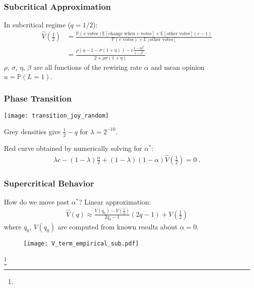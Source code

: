 \documentclass{beamer}
\newcommand\blfootnote[1]{%
  \begingroup
  \renewcommand\thefootnote{}\footnote{#1}%
  \addtocounter{footnote}{-1}%
  \endgroup
}
\newcommand\E[0]{\mathbb{E}}
\newcommand\prob[0]{\mathbb{P}}
\begin{document}
		\begin{frame}\frametitle{Subcritical Approximation}
			In subcritical regime ($q = 1/2$): 
			\begin{align*}
				\hat{V}\left(\frac{1}{2}\right) &=  \frac{\mathbb{P}(v \text{ votes})\E[\text{change when } v \text{ votes}] + \E[\text{other votes}](c-1)}{\mathbb{P}(v \text{ votes}) + \E[\text{other votes}]} \\ 
				&= \frac{\rho(\eta - 1 - \sigma(1+\eta)) - c\frac{1 - \eta \beta^c}{1-\beta^c}}{2+\rho\sigma(1+\eta)}
			\end{align*}
			$\rho$, $\sigma$, $\eta$, $\beta$ are all functions of the rewiring rate $\alpha$ and mean opinion $u = \prob(L = 1)$. 
		\end{frame}
	
		
		\begin{frame}\frametitle{Phase Transition}
		  		{ \centering
		  			\texttt{[image: transition\_joy\_random]}\par
		  		}
		  		Grey densities give $\frac{1}{2} - q$\; for $\lambda = 2^{-10}$.
		  		
		  		Red curve obtained by numerically solving for $\alpha^*$:
		  		\begin{align*}
		  			 \lambda c -(1-\lambda)\frac{\alpha}{2} + (1-\lambda)(1-\alpha)\hat{V}\left(\frac{1}{2}\right) = 0\;.
		  		\end{align*}
		  	
		\end{frame}
	
		
		\begin{frame}\frametitle{Supercritical Behavior}
			
			How do we move past $\alpha^*$? Linear approximation:  
			\begin{align*}
				\hat{V}(q) \approx \frac{V(q_0) - V\left(\frac{1}{2}\right)}{2q_0 -1}(2q - 1) + V\left(\frac{1}{2}\right)
			\end{align*}
			where $q_0$, $V(q_0)$ are computed from known results about $\alpha = 0$.		
		
			\begin{figure}
				\texttt{[image: V\_term\_empirical\_sub.pdf]}
				\caption{} 
			\end{figure}

			\blfootnote{}
		\end{frame}
	
\end{document}
